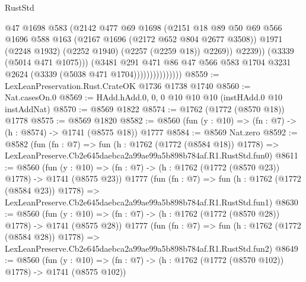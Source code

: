 \begin{lexlean}{RustStd}
\begin{coremodule}
                                  @47
                                  @1698
                                  @583
                                  (@2142
                                    @477
                                    @69
                                    @1698
                                    (@2151
                                      @18
                                      @89
                                      @50
                                      @69
                                      @566
                                      @1696
                                      @588
                                      @163
                                      (@2167 @1696 (@2172 @652 @804 @2677 @3508))
                                      @1971
                                      (@2248 @1932)
                                      (@2252 @1940)
                                      (@2257 (@2259 @18))
                                      @2269))
                                  @2239))
                              (@3339 (@5014 @471 @1075)))
                            (@3481
                              @291
                              @471
                              @86
                              @47
                              @566
                              @583
                              @1704
                              @3231
                              @2624
                              (@3339 (@5038 @471 @1704)))))))))))))))
@8559 := LexLeanPreservation.Rust.CrateOK @1736 @1738 @1740
@8560 := Nat.casesOn.{0}
@8569 := HAdd.hAdd.{0, 0, 0} @10 @10 @10 (instHAdd.{0} @10 instAddNat)
@8570 := @8569 @1822
@8574 := @1762 (@1772 (@8570 @18)) @1778
@8575 := @8569 @1820
@8582 := @8560 (fun (y : @10) => (fn : @7) -> (h : @8574) -> @1741 (@8575 @18)) @1777
@8584 := @8569 Nat.zero
@8592 := @8582
    (fun (fn : @7) =>
    fun (h : @1762 (@1772 (@8584 @18)) @1778) =>
    LexLeanPreserve.Cb2e645daebca2a99ae99a5b898b784af.R1.RustStd.fun0)
@8611 := @8560
    (fun (y : @10) => (fn : @7) -> (h : @1762 (@1772 (@8570 @23)) @1778) -> @1741 (@8575 @23))
    @1777
    (fun (fn : @7) =>
    fun (h : @1762 (@1772 (@8584 @23)) @1778) =>
    LexLeanPreserve.Cb2e645daebca2a99ae99a5b898b784af.R1.RustStd.fun1)
@8630 := @8560
    (fun (y : @10) => (fn : @7) -> (h : @1762 (@1772 (@8570 @28)) @1778) -> @1741 (@8575 @28))
    @1777
    (fun (fn : @7) =>
    fun (h : @1762 (@1772 (@8584 @28)) @1778) =>
    LexLeanPreserve.Cb2e645daebca2a99ae99a5b898b784af.R1.RustStd.fun2)
@8649 := @8560
    (fun (y : @10) => (fn : @7) -> (h : @1762 (@1772 (@8570 @102)) @1778) -> @1741 (@8575 @102))

\end{coremodule}
\end{lexlean}
